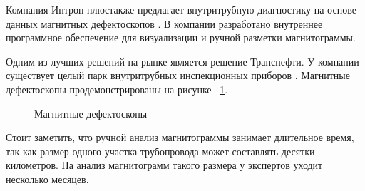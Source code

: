 \documentclass[a4paper,article,14pt]{extarticle}
\begin{document}
Компания \flqq Интрон плюс\frqq также предлагает внутритрубную диагностику на основе данных магнитных дефектоскопов \cite{s3}. 
В компании разработано внутреннее программное обеспечение для визуализации и ручной разметки магнитограммы. 

Одним из лучших решений на рынке является решение \flqq Транснефти\frqq. У компании существует целый парк внутритрубных инспекционных 
приборов \cite{s4}. 
Магнитные дефектоскопы продемонстрированы на рисунке ~\ref{image2}.

\begin{figure}[ht]
    \begin{center}
    
    \caption{
    \label{image2}
    Магнитные дефектоскопы}
    \end {center}
\end {figure}

Стоит заметить, что ручной анализ магнитограммы занимает длительное время, так как размер одного участка трубопровода 
может составлять десятки километров. На анализ магнитограмм такого размера у экспертов уходит несколько месяцев.
\end{document}

